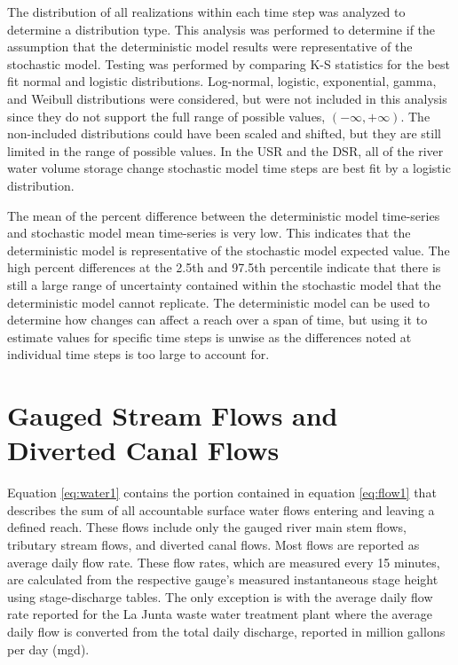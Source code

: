 \begin{linenumbers}
The distribution of all realizations within each time step was analyzed to determine a distribution type.  This analysis was performed to determine if the assumption that the deterministic model results were representative of the stochastic model.   Testing was performed by comparing K-S statistics for the best fit normal and logistic distributions.  Log-normal, logistic, exponential, gamma, and Weibull distributions were considered, but were not included in this analysis since they do not support the full range of possible values, $ (-\infty, +\infty) $.  The non-included distributions could have been scaled and shifted, but they are still limited in the range of possible values.  In the USR and the DSR, all of the river water volume storage change stochastic model time steps are best fit by a logistic distribution.
  
The mean of the percent difference between the deterministic model time-series and stochastic model mean time-series is very low.  This indicates that the deterministic model is representative of the stochastic model expected value.  The high percent differences at the 2.5th and 97.5th percentile indicate that there is still a large range of uncertainty contained within the stochastic model that the deterministic model cannot replicate.  The deterministic model can be used to determine how changes can affect a reach over a span of time, but using it to estimate values for specific time steps is unwise as the differences noted at individual time steps is too large to account for.
\clearpage{}

\section{Gauged Stream Flows and Diverted Canal Flows}
\label{sec:StreamFlows}

Equation \ref{eq:water1} contains the portion contained in equation \ref{eq:flow1} that describes the sum of all accountable surface water flows entering and leaving a defined reach.  These flows include only the gauged river main stem flows, tributary stream flows, and diverted canal flows.  Most flows are reported as average daily flow rate.  These flow rates, which are measured every 15 minutes, are calculated from the respective gauge's measured instantaneous stage height using stage-discharge tables.  The only exception is with the average daily flow rate reported for the La Junta waste water treatment plant where the average daily flow is converted from the total daily discharge, reported in million gallons per day (mgd).


\end{linenumbers}
